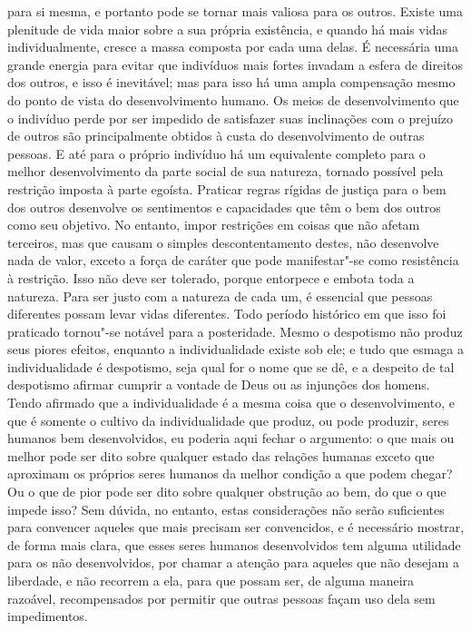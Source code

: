 para si mesma, e portanto pode se tornar mais valiosa para os outros.
Existe uma plenitude de vida maior sobre a sua própria existência, e quando
há mais vidas individualmente, cresce a massa
composta por cada uma delas. É necessária uma grande energia para evitar que
indivíduos mais fortes invadam a esfera de direitos dos
outros, e isso é inevitável; mas para isso há uma ampla compensação
mesmo do ponto de vista do desenvolvimento humano. Os meios de desenvolvimento
que o indivíduo perde por ser impedido de satisfazer suas inclinações
com o prejuízo de outros são principalmente obtidos à custa do desenvolvimento
de outras pessoas. E até para o próprio indivíduo há um equivalente completo para o melhor
desenvolvimento da parte social de sua natureza, tornado possível pela
restrição imposta à parte egoísta. Praticar regras rígidas de justiça
para o bem dos outros desenvolve os sentimentos e capacidades que têm
o bem dos outros como seu objetivo. No entanto, impor restrições em coisas que não
afetam terceiros, mas que causam o simples descontentamento destes, não desenvolve nada de valor,
exceto a força de caráter que pode manifestar"-se como resistência à restrição.
Isso não deve ser tolerado, porque entorpece e embota toda a natureza.
Para ser justo com a natureza de cada um, é essencial
que pessoas diferentes possam levar vidas diferentes.
Todo período histórico em que isso foi praticado tornou"-se
notável para a posteridade. Mesmo o despotismo não produz seus piores
efeitos, enquanto a individualidade existe sob ele; e tudo que esmaga
a individualidade é despotismo, seja qual for o nome que se dê, e a despeito de tal despotismo 
afirmar cumprir a vontade de Deus ou as injunções dos homens.
Tendo afirmado que a individualidade é a mesma coisa que o desenvolvimento, e
que é somente o cultivo da individualidade que produz, ou pode
produzir, seres humanos bem desenvolvidos, eu poderia aqui fechar o argumento:
o que mais ou melhor pode ser dito sobre qualquer estado das relações humanas
exceto que aproximam os próprios seres humanos da melhor condição
a que podem chegar? Ou o que de pior pode ser dito sobre qualquer obstrução ao bem,
do que o que impede isso? Sem dúvida, no entanto, estas considerações
não serão suficientes para convencer aqueles que mais precisam ser convencidos, e 
é necessário mostrar, de forma mais clara, que esses seres humanos desenvolvidos
tem alguma utilidade para os não desenvolvidos, por chamar a atenção para aqueles que não
desejam a liberdade, e não recorrem a ela, para que possam
ser, de alguma maneira razoável, recompensados por permitir que outras pessoas
façam uso dela sem impedimentos.

